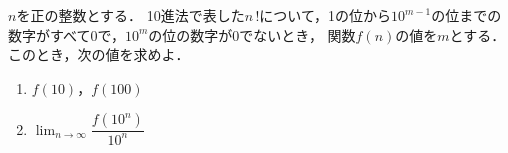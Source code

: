\documentclass[../../main.tex]{subfiles}
\begin{document}
$n$を正の整数とする．
10進法で表した$n \, !$について，1の位から$10^{m-1}$の位までの数字がすべて0で，$10^{m}$の位の数字が0でないとき，
関数$f(n)$の値を$m$とする．このとき，次の値を求めよ．
\begin{enumerate}
  \item $f(10)$，$f(100)$
  \item $\displaystyle\lim_{n\to\infty}\dfrac{f(10^n)}{10^n}$
\end{enumerate}
\end{document}
